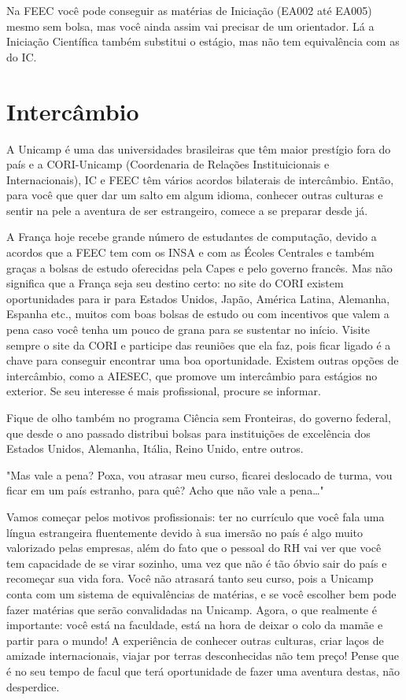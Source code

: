 Na FEEC você pode conseguir as matérias de Iniciação (EA002 até EA005) mesmo sem
bolsa, mas você ainda assim vai precisar de um orientador. Lá a Iniciação
Científica também substitui o estágio, mas não tem equivalência com as do IC.

\section{Intercâmbio}

A Unicamp é uma das universidades brasileiras que têm maior prestígio fora do país
e a CORI-Unicamp (Coordenaria de Relações Instituicionais e Internacionais), IC e FEEC têm
vários acordos bilaterais de intercâmbio. Então, para você que quer dar um salto
em algum idioma, conhecer outras culturas e sentir na pele a aventura de ser
estrangeiro, comece a se preparar desde já.

A França hoje recebe grande número de estudantes de computação, devido a acordos que
a FEEC tem com os INSA e com as Écoles Centrales e também graças a bolsas de
estudo oferecidas pela Capes e pelo governo francês. Mas não significa que
a França seja seu destino certo: no site do CORI existem oportunidades para ir
para Estados Unidos, Japão, América Latina, Alemanha, Espanha etc., muitos com boas bolsas
de estudo ou com incentivos que valem a pena caso você
tenha um pouco de grana para se sustentar no início. Visite sempre o site da
CORI e participe das reuniões que ela faz, pois ficar ligado é a chave para conseguir
encontrar uma boa oportunidade. Existem outras opções de intercâmbio, como
a AIESEC, que promove um intercâmbio para estágios no exterior. Se seu interesse
é mais profissional, procure se informar.

Fique de olho também no programa Ciência sem Fronteiras, do governo federal,
que desde o ano passado distribui bolsas para instituições de excelência dos Estados Unidos, Alemanha, Itália,
Reino Unido, entre outros.

"Mas vale a pena? Poxa, vou atrasar meu curso, ficarei deslocado de turma, vou
ficar em um país estranho, para quê? Acho que não vale a pena{\dots}"

Vamos começar pelos motivos profissionais: ter no currículo que você fala uma
língua estrangeira fluentemente devido à sua imersão no país é algo muito
valorizado pelas empresas, além do fato que o pessoal do RH vai ver que você tem
capacidade de se virar sozinho, uma vez que não é tão óbvio sair do país
e recomeçar sua vida fora. Você não atrasará tanto seu curso, pois a Unicamp
conta com um sistema de equivalências de matérias, e se você escolher bem pode
fazer matérias que serão convalidadas na Unicamp. Agora, o que realmente
é importante: você está na faculdade, está na hora de deixar o colo da mamãe
e partir para o mundo! A experiência de conhecer outras culturas, criar
laços de amizade internacionais, viajar por terras
desconhecidas não tem preço! Pense que é no seu tempo de facul que terá
oportunidade de fazer uma aventura destas, não desperdice.

